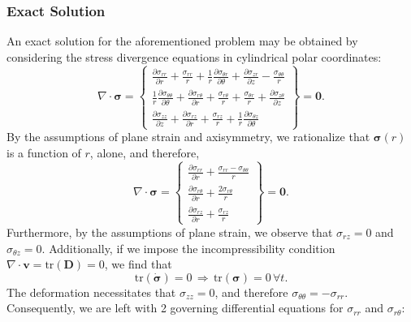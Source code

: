 \subsubsection*{Exact Solution}

An exact solution for the aforementioned problem may be obtained by considering the stress divergence equations in cylindrical polar coordinates:
\begin{equation}
  \nabla \cdot \boldsymbol{\sigma} = \left\{ \begin{array}{c} \frac{\partial \sigma_{rr}}{\partial r} + \frac{\sigma_{rr}}{r} + \frac{1}{r} \frac{\partial \sigma_{\theta r}}{\partial \theta} + \frac{\partial \sigma_{z r}}{\partial z} - \frac{\sigma_{\theta \theta}}{r} \\
    \frac{1}{r} \frac{\partial \sigma_{\theta \theta}}{\partial \theta} + \frac{\partial \sigma_{r\theta}}{\partial r} + \frac{\sigma_{r\theta}}{r} + \frac{\sigma_{\theta r}}{r} + \frac{\partial \sigma_{z \theta}}{\partial z} \\
    \frac{\partial \sigma_{z z}}{\partial z} + \frac{\partial \sigma_{r z}}{\partial r} + \frac{\sigma_{r z}}{r} + \frac{1}{r} \frac{\partial \sigma_{\theta z}}{\partial \theta} \end{array} \right\} = \mathbf{0}.
\end{equation}
By the assumptions of plane strain and axisymmetry, we rationalize that $\boldsymbol{\sigma} (r)$ is a function of $r$, alone, and therefore,
\begin{equation}
  \nabla \cdot \boldsymbol{\sigma} = \left\{ \begin{array}{c} \frac{\partial \sigma_{rr}}{\partial r} + \frac{\sigma_{rr} - \sigma_{\theta \theta}}{r} \\
    \frac{\partial \sigma_{r\theta}}{\partial r} + \frac{2 \sigma_{r\theta}}{r} \\
    \frac{\partial \sigma_{r z}}{\partial r} + \frac{\sigma_{r z}}{r} \end{array} \right\} = \mathbf{0}.
\end{equation}
Furthermore, by the assumptions of plane strain, we observe that $\sigma_{rz} = 0$ and $\sigma_{\theta z} = 0$. Additionally, if we impose the incompressibility condition $\nabla \cdot \mathbf{v} = \text{tr} (\mathbf{D}) = 0$, we find that
\begin{equation}
  \text{tr} (\dot{\boldsymbol{\sigma}}) = 0 \, \Rightarrow \, \text{tr} (\boldsymbol{\sigma}) = 0 \, \forall t.
\end{equation}
The deformation necessitates that $\sigma_{zz} = 0$, and therefore $\sigma_{\theta \theta} = - \sigma_{rr}$. Consequently, we are left with 2 governing differential equations for $\sigma_{rr}$ and $\sigma_{r \theta}$:

